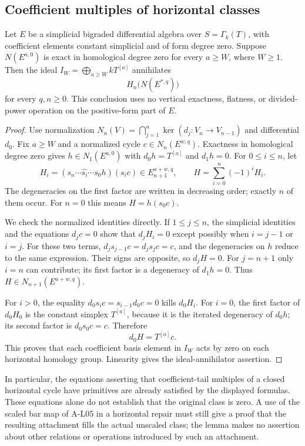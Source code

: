 \subsection{Coefficient multiples of horizontal classes}

\begin{lemma}
\label{AH01}
Let $E$ be a simplicial bigraded differential algebra over
$S=\Gamma_k(T)$, with coefficient elements constant simplicial
and of form degree zero. Suppose $N(E^{a,0})$ is exact in
homological degree zero for every $a\geq W$, where $W\geq1$.
Then the ideal
$I_W=\bigoplus_{a\geq W}kT^{[a]}$ annihilates
\[
 H_n\bigl(N(E^{*,q})\bigr)
\]
for every $q,n\geq0$. This conclusion uses no vertical
exactness, flatness, or divided-power operation on the
positive-form part of $E$.
\end{lemma}

\begin{proof}
Use normalization
$N_n(V)=\bigcap_{j=1}^{n}\ker(d_j:V_n\to V_{n-1})$
and differential $d_0$. Fix $a\geq W$ and a normalized
cycle $c\in N_n(E^{w,q})$. Exactness in homological
degree zero gives
$h\in N_1(E^{a,0})$ with
$d_0h=T^{[a]}$ and $d_1h=0$.
For $0\leq i\leq n$, let
\[
 H_i=(s_n\cdots\widehat{s_i}\cdots s_0 h)(s_i c)
       \in E_{n+1}^{a+w,q},
 \qquad H=\sum_{i=0}^{n}(-1)^iH_i .
\]
The degeneracies on the first factor are written in
decreasing order; exactly $n$ of them occur. For $n=0$
this means $H=h(s_0c)$.

We check the normalized identities directly. If
$1\leq j\leq n$, the simplicial identities and the
equations $d_jc=0$ show that $d_jH_i=0$ except possibly
when $i=j-1$ or $i=j$. For these two terms,
$d_j s_{j-1}c=d_j s_jc=c$, and the degeneracies on
$h$ reduce to the same expression. Their signs are
opposite, so $d_jH=0$.
For $j=n+1$ only $i=n$ can contribute; its first
factor is a degeneracy of $d_1h=0$.
Thus $H\in N_{n+1}(E^{a+w,q})$.

For $i>0$, the equality
$d_0s_i c=s_{i-1}d_0c=0$ kills $d_0H_i$.
For $i=0$, the first factor of $d_0H_0$ is the
constant simplex $T^{[a]}$, because it is the
iterated degeneracy of $d_0h$; its second factor is
$d_0s_0c=c$. Therefore
\[
 d_0H=T^{[a]}c.
\]
This proves that each coefficient basis element in
$I_W$ acts by zero on each horizontal homology group.
Linearity gives the ideal-annihilator assertion.
\end{proof}

In particular, the equations asserting that coefficient-tail
multiples of a closed horizontal cycle have primitives
are already satisfied by the displayed formulas. These
equations alone do not establish that the original class
is zero. A use of the scaled bar map of A-L05 in a
horizontal repair must still give a proof that the
resulting attachment fills the actual unscaled class;
the lemma makes no assertion about other relations or
operations introduced by such an attachment.
